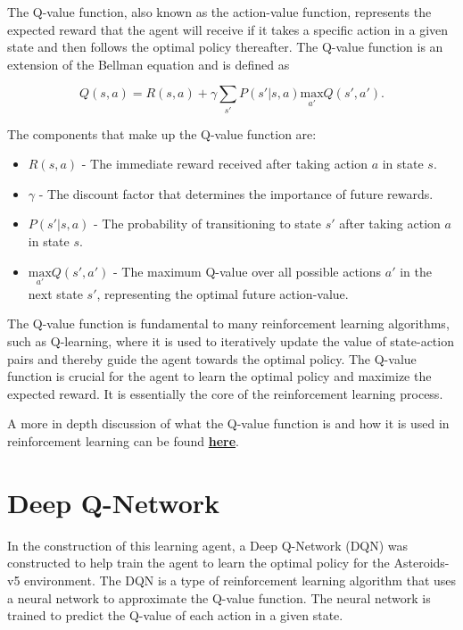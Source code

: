 \documentclass[
	a4paper, %
	10pt, %
	unnumberedsections, %
	twoside, %
]{LTJournalArticle}
\begin{document}
The Q-value function, also known as the action-value function, represents the expected reward that the agent will receive if it takes a specific action in a given state and then follows the optimal 
policy thereafter. The Q-value function is an extension of the Bellman equation and is defined as

\begin{equation}\label{eq:qvalue}
    Q(s,a) = R(s,a) + \gamma \sum_{s'} P(s'|s,a) \underset{a'}{\text{max}} Q(s',a').
\end{equation}

The components that make up the Q-value function are:

\begin{itemize}
    \item $R(s,a)$ - The immediate reward received after taking action $a$ in state $s$.
    \item $\gamma$ - The discount factor that determines the importance of future rewards.
    \item $P(s'|s,a)$ - The probability of transitioning to state $s'$ after taking action $a$ in state $s$.
    \item $\underset{a'}{\text{max}} Q(s',a')$ - The maximum Q-value over all possible actions $a'$ in the next state $s'$, representing the optimal future action-value.
\end{itemize}

The Q-value function is fundamental to many reinforcement learning algorithms, such as Q-learning, where it is used to iteratively update the value of state-action pairs and thereby guide the agent 
towards the optimal policy. The Q-value function is crucial for the agent to learn the optimal policy and maximize the expected reward. It is essentially the core of the reinforcement learning process.

A more in depth discussion of what the Q-value function is and how it is used in reinforcement learning can be found \href{https://en.wikipedia.org/wiki/Q-learning}{\textbf{here}}.

\section{Deep Q-Network}

In the construction of this learning agent, a Deep Q-Network (DQN) was constructed to help train the agent to learn the optimal policy for the Asteroids-v5 environment. The DQN is a type of reinforcement
learning algorithm that uses a neural network to approximate the Q-value function. The neural network is trained to predict the Q-value of each action in a given state.
\end{document}
